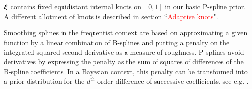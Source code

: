 \documentclass[twocolumn,final]{svjour3}
\newcommand{\bm}[1]{\mbox{\boldmath $#1$}}
\begin{document}
$\bm{\xi}$ contains fixed equidistant internal knots on $[0,1]$ in our basic P-spline prior. A different  allotment of knots is described in  section ``\textcolor{red}{Adaptive knots}".

Smoothing splines in the frequentist context are based on approximating a given function by a linear combination of B-splines and
putting a penalty on the integrated squared second derivative  as a measure of roughness. P-splines avoid derivatives by expressing the penalty as the sum of squares of differences of the B-spline coefficients.
In a Bayesian context, this penalty can be transformed into a prior distribution for the $d^{\text{th}}$ order difference of successive coefficients, see e.g. \cite{Lang:2004}.
\end{document}
